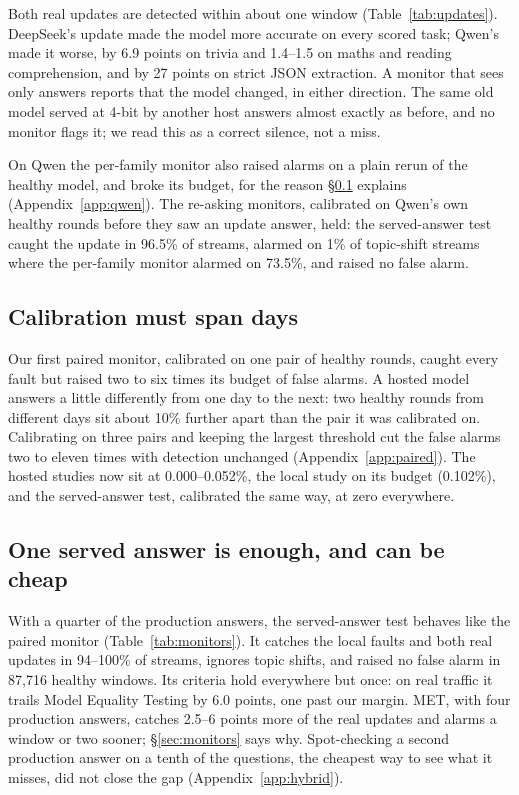 \documentclass{article}
\begin{document}
Both real updates are detected within about one window (Table~\ref{tab:updates}).
DeepSeek's update made the model more accurate on every scored task; Qwen's made
it worse, by 6.9 points on trivia and 1.4--1.5 on maths and reading comprehension,
and by 27 points on strict JSON extraction. A monitor
that sees only answers reports that the model changed, in either direction. The
same old model served at 4-bit by another host answers almost exactly as before,
and no monitor flags it; we read this as a correct silence, not a miss.

On Qwen the per-family monitor also raised alarms on a plain rerun of the healthy
model, and broke its budget, for the reason \S\ref{sec:days} explains
(Appendix~\ref{app:qwen}). The re-asking monitors, calibrated on Qwen's own
healthy rounds before they saw an update answer, held: the served-answer test
caught the update in 96.5\% of streams, alarmed on 1\% of topic-shift streams
where the per-family monitor alarmed on 73.5\%, and raised no false alarm.

\subsection{Calibration must span days}
\label{sec:days}

Our first paired monitor, calibrated on one pair of healthy rounds, caught every
fault but raised two to six times its budget of false alarms. A hosted model
answers a little differently from one day to the next: two healthy rounds from
different days sit about 10\% further apart than the pair it was calibrated on.
Calibrating on three pairs and keeping the largest threshold cut the false alarms
two to eleven times with detection unchanged (Appendix~\ref{app:paired}). The hosted
studies now sit at 0.000--0.052\%, the local study on its budget (0.102\%), and the
served-answer test, calibrated the same way, at zero everywhere.

\subsection{One served answer is enough, and can be cheap}
\label{sec:cost}

With a quarter of the production answers, the served-answer test behaves like the
paired monitor (Table~\ref{tab:monitors}). It catches the local faults and both
real updates in 94--100\% of streams, ignores topic shifts, and raised no false
alarm in 87{,}716 healthy windows. Its criteria hold everywhere but once: on real
traffic it trails Model Equality Testing by 6.0 points, one past our margin. MET,
with four production answers, catches 2.5--6 points more of the real updates and
alarms a window or two sooner; \S\ref{sec:monitors} says why. Spot-checking a
second production answer on a tenth of the questions, the cheapest way to see what
it misses, did not close the gap (Appendix~\ref{app:hybrid}).
\end{document}
